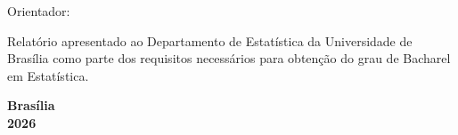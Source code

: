 \thispagestyle{empty}
\begin{center}
\textbf{\autor}\par
\vspace{4cm}
\textbf{\titulo}\par
\vspace{2cm}
Orientador: \orientador
\end{center}
\vspace{2cm}
\begin{flushright}
\begin{minipage}{7.5cm}
Relatório apresentado ao Departamento de Estatística da Universidade de Brasília como parte dos requisitos necessários para obtenção do grau de Bacharel em Estatística.
\end{minipage}
\end{flushright}
\vfill
\begin{center}\textbf{Brasília\\2026}\end{center}
